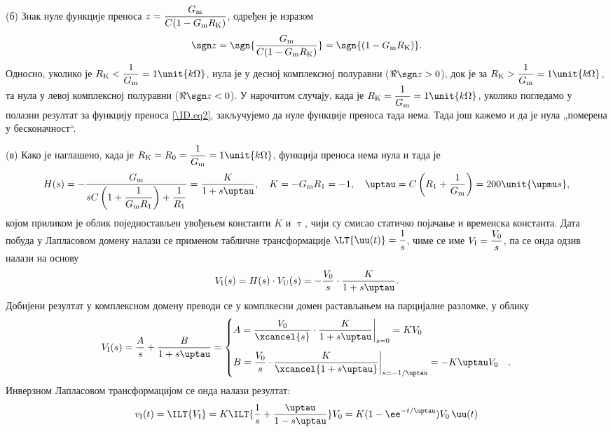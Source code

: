 (б) Знак нуле функције преноса $z = \dfrac{G_{\rm m}}{C(1 - G_{\rm m} R_{\rm K})}$, одређен је изразом
\begin{equation}
    \sgn z = \sgn {\dfrac{G_{\rm m}}{C(1 - G_{\rm m} R_{\rm K})}} = \sgn{(1 - G_{\rm m} R_{\rm K})}.
\end{equation}
Односно, уколико је $R_{\rm K} < \dfrac{1}{G_{\rm m}} = 1\unit{k\Omega}$, нула је у десној комплексној полуравни ($\Re{\sgn z} > 0$), док је 
за $R_{\rm K} > \dfrac{1}{G_{\rm m}} = 1\unit{k\Omega}$, та нула у левој комплексној полуравни ($\Re {\sgn z} < 0$). У нарочитом случају, 
када је $R_{\rm K} = \dfrac{1}{G_{\rm m}} = 1\unit{k\Omega}$, уколико погледамо у полазни резултат за функцију преноса \ref{\ID.eq2}, закључујемо да нуле функције преноса 
тада нема. Тада још кажемо и да је нула „померена у бесконачност“.

(в) Како је наглашено, када је $R_{\rm K} = R_0 = \dfrac{1}{G_{\rm m}} = 1\unit{k\Omega}$, функција преноса нема нула и тада је 
\small
\begin{equation}
    H(s) = - \dfrac{G_{\rm m} }{ sC\left(1 + \dfrac{1}{G_{\rm m} R_1}\right) + \dfrac{1}{R_1} } 
    = \dfrac{K}{1 + s\uptau}, \quad K = -G_{\rm m}{R_1} = -1, \quad \uptau = C\left( R_1 + \dfrac{1}{G_{\rm m}} \right) = 200\unit{\upmu s},
\end{equation}
\normalsize
којом приликом је облик поједностављен увођењем константи $K$ и $\uptau$, чији су смисао статичко појачање и временска константа.  
Дата побуда у Лапласовом домену налази се применом табличне трансформације 
$\LT{\uu(t)} = \dfrac{1}{s}$, чиме се име $V_{\rm I} = \dfrac{V_0}{s}$, па се онда одзив налази на основу 
\begin{eqnarray}
    V_{\rm I}(s) = H(s) \cdot V_{\rm U}(s) = - \dfrac{V_{0}}{s} \cdot \dfrac{K}{1 + s\uptau}.
\end{eqnarray}
Добијени резултат у комплексном домену преводи се у комплкесни домен растављањем на парцијалне разломке, у облику 
\begin{eqnarray} 
    V_{\rm I}(s) = \dfrac{A}{s} + \dfrac{B}{1 + s\uptau} = 
    \begin{cases}
        A = \dfrac{V_{0}}{\xcancel{s}} \cdot  \dfrac{K}{1 + s\uptau}  \bigg|_{s = 0} = 
        K V_0 & \\[5mm]
        B =  
        \dfrac{V_{0}}{s} \cdot  \dfrac{K}{\xcancel{1 + s\uptau}}  \bigg|_{s = -1/\uptau} = -K \uptau V_0
        &.
    \end{cases}
\end{eqnarray}
Инверзном Лапласовом трансформацијом се онда налази резултат: 
\begin{equation}
    v_{\rm I}(t) = \ILT{V_{\rm I}} = K \ILT{ \dfrac{1}{s} + \dfrac{\uptau}{1 - s\uptau} } V_0 = 
    {K}(1 - \ee^{-t/\uptau} ) V_0 \, \uu(t)
\end{equation}

